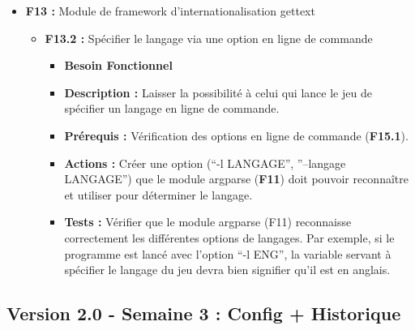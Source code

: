 \documentclass{article}
\begin{document}
\begin{itemize}
\begin{itemize}
    \end{itemize}
\bigskip
    \item \textbf{F13 :} Module de framework d’internationalisation gettext
    \begin{itemize}
        \item \textbf{F13.2 :} Spécifier le langage via une option en ligne de commande
        \begin{itemize}
            \item \textbf{Besoin Fonctionnel}
            \item \textbf{Description :} Laisser la possibilité à celui qui lance le jeu de spécifier un langage en ligne de commande.
            \item \textbf{Prérequis :} Vérification des options en ligne de commande (\textbf{F15.1}).
            \item \textbf{Actions :} Créer une option (“-l LANGAGE”, ”--langage LANGAGE”) que le module argparse (\textbf{F11}) doit pouvoir reconnaître et utiliser pour déterminer le langage.
            \item \textbf{Tests :} Vérifier que le module argparse (F11) reconnaisse correctement les différentes options de langages. Par exemple, si le programme est lancé avec l’option “-l ENG”, la variable servant à spécifier le langage du jeu devra bien signifier qu’il est en anglais.
        \end{itemize}
    \end{itemize}
\end{itemize}

\subsection{Version 2.0 - Semaine 3 : Config + Historique}
\end{document}
